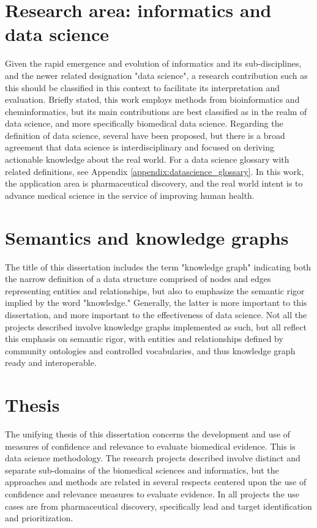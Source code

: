 \section{Research area: informatics and data science}

Given the rapid emergence and evolution of informatics and its sub-disciplines, and the newer related designation "data science", a research contribution such as this should be classified in this context to facilitate its interpretation and evaluation. Briefly stated, this work employs methods from bioinformatics and cheminformatics, but its main contributions are best classified as in the realm of data science, and more specifically biomedical data science. Regarding the definition of data science, several have been proposed\cite{ONeil2013-je,Peng2016-gq}, but there is a broad agreement that data science is interdisciplinary and focused on deriving actionable knowledge about the real world. For a data science glossary with related definitions, see Appendix \ref{appendix:datascience_glossary}. In this work, the application area is pharmaceutical discovery, and the real world intent is to advance medical science in the service of improving human health.

\section{Semantics and knowledge graphs}

The title of this dissertation includes the term "knowledge graph" indicating both the narrow definition of a data structure comprised of nodes and edges representing entities and relationships, but also to emphasize the semantic rigor implied by the word "knowledge." Generally, the latter is more important to this dissertation, and more important to the effectiveness of data science. Not all the projects described involve knowledge graphs implemented as such, but all reflect this emphasis on semantic rigor, with entities and relationships defined by community ontologies and controlled vocabularies, and thus knowledge graph ready and interoperable.

\section{Thesis}

The unifying thesis of this dissertation concerns the development and use of measures of confidence and relevance to evaluate biomedical evidence. This is data science methodology. The research projects described involve distinct and separate sub-domains of the biomedical sciences and informatics, but the approaches and methods are related in several respects centered upon the use of confidence and relevance measures to evaluate evidence. In all projects the use cases are from pharmaceutical discovery, specifically lead and target identification and prioritization.  

